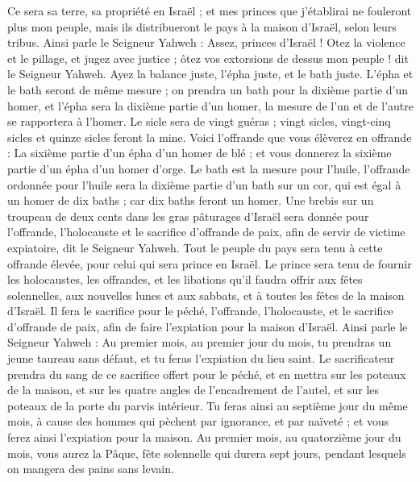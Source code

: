 \begin{multicols}{2}
Ce sera sa terre, sa propriété en Israël ; et mes princes que j'établirai ne fouleront plus mon peuple, mais ils distribueront le pays à la maison d'Israël, selon leurs tribus.
Ainsi parle le Seigneur Yahweh : Assez, princes d'Israël ! Otez la violence et le pillage, et jugez avec justice ; ôtez vos extorsions de dessus mon peuple ! dit le Seigneur Yahweh.
Ayez la balance juste, l'épha juste, et le bath juste.
L'épha et le bath seront de même mesure ; on prendra un bath pour la dixième partie d'un homer, et l'épha sera la dixième partie d'un homer, la mesure de l'un et de l'autre se rapportera à l'homer.
Le sicle sera de vingt guéras ; vingt sicles, vingt-cinq sicles et quinze sicles feront la mine.
Voici l’offrande que vous élèverez en offrande : La sixième partie d'un épha d'un homer de blé ; et vous donnerez la sixième partie d'un épha d'un homer d'orge.
Le bath est la mesure pour l'huile, l'offrande ordonnée pour l'huile sera la dixième partie d'un bath sur un cor, qui est égal à un homer de dix baths ; car dix baths feront un homer.
Une brebis sur un troupeau de deux cents dans les gras pâturages d’Israël sera donnée pour l’offrande, l’holocauste et le sacrifice d’offrande de paix, afin de servir de victime expiatoire, dit le Seigneur Yahweh.
Tout le peuple du pays sera tenu à cette offrande élevée, pour celui qui sera prince en Israël.
Le prince sera tenu de fournir les holocaustes, les offrandes, et les libations qu'il faudra offrir aux fêtes solennelles, aux nouvelles lunes et aux sabbats, et à toutes les fêtes de la maison d'Israël. Il fera le sacrifice pour le péché, l’offrande, l’holocauste, et le sacrifice d’offrande de paix, afin de faire l’expiation pour la maison d'Israël.
Ainsi parle le Seigneur Yahweh : Au premier mois, au premier jour du mois, tu prendras un jeune taureau sans défaut, et tu feras l’expiation du lieu saint.
Le sacrificateur prendra du sang de ce sacrifice offert pour le péché, et en mettra sur les poteaux de la maison, et sur les quatre angles de l’encadrement de l'autel, et sur les poteaux de la porte du parvis intérieur.
Tu feras ainsi au septième jour du même mois, à cause des hommes qui pèchent par ignorance, et par naïveté ; et vous ferez ainsi l’expiation pour la maison.
Au premier mois, au quatorzième jour du mois, vous aurez la Pâque, fête solennelle qui durera sept jours, pendant lesquels on mangera des pains sans levain.

\end{multicols}
